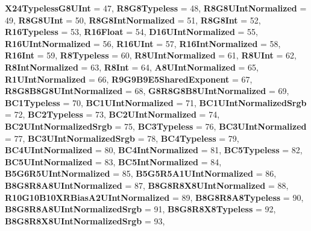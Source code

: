 \begin{DoxyCompactItemize}
{\bfseries X24\+Typeless\+G8\+U\+Int} = 47, 
\newline
{\bfseries R8\+G8\+Typeless} = 48, 
{\bfseries R8\+G8\+U\+Int\+Normalized} = 49, 
{\bfseries R8\+G8\+U\+Int} = 50, 
{\bfseries R8\+G8\+Int\+Normalized} = 51, 
\newline
{\bfseries R8\+G8\+Int} = 52, 
{\bfseries R16\+Typeless} = 53, 
{\bfseries R16\+Float} = 54, 
{\bfseries D16\+U\+Int\+Normalized} = 55, 
\newline
{\bfseries R16\+U\+Int\+Normalized} = 56, 
{\bfseries R16\+U\+Int} = 57, 
{\bfseries R16\+Int\+Normalized} = 58, 
{\bfseries R16\+Int} = 59, 
\newline
{\bfseries R8\+Typeless} = 60, 
{\bfseries R8\+U\+Int\+Normalized} = 61, 
{\bfseries R8\+U\+Int} = 62, 
{\bfseries R8\+Int\+Normalized} = 63, 
\newline
{\bfseries R8\+Int} = 64, 
{\bfseries A8\+U\+Int\+Normalized} = 65, 
{\bfseries R1\+U\+Int\+Normalized} = 66, 
{\bfseries R9\+G9\+B9\+E5\+Shared\+Exponent} = 67, 
\newline
{\bfseries R8\+G8\+B8\+G8\+U\+Int\+Normalized} = 68, 
{\bfseries G8\+R8\+G8\+B8\+U\+Int\+Normalized} = 69, 
{\bfseries B\+C1\+Typeless} = 70, 
{\bfseries B\+C1\+U\+Int\+Normalized} = 71, 
\newline
{\bfseries B\+C1\+U\+Int\+Normalized\+Srgb} = 72, 
{\bfseries B\+C2\+Typeless} = 73, 
{\bfseries B\+C2\+U\+Int\+Normalized} = 74, 
{\bfseries B\+C2\+U\+Int\+Normalized\+Srgb} = 75, 
\newline
{\bfseries B\+C3\+Typeless} = 76, 
{\bfseries B\+C3\+U\+Int\+Normalized} = 77, 
{\bfseries B\+C3\+U\+Int\+Normalized\+Srgb} = 78, 
{\bfseries B\+C4\+Typeless} = 79, 
\newline
{\bfseries B\+C4\+U\+Int\+Normalized} = 80, 
{\bfseries B\+C4\+Int\+Normalized} = 81, 
{\bfseries B\+C5\+Typeless} = 82, 
{\bfseries B\+C5\+U\+Int\+Normalized} = 83, 
\newline
{\bfseries B\+C5\+Int\+Normalized} = 84, 
{\bfseries B5\+G6\+R5\+U\+Int\+Normalized} = 85, 
{\bfseries B5\+G5\+R5\+A1\+U\+Int\+Normalized} = 86, 
{\bfseries B8\+G8\+R8\+A8\+U\+Int\+Normalized} = 87, 
\newline
{\bfseries B8\+G8\+R8\+X8\+U\+Int\+Normalized} = 88, 
{\bfseries R10\+G10\+B10\+X\+R\+Bias\+A2\+U\+Int\+Normalized} = 89, 
{\bfseries B8\+G8\+R8\+A8\+Typeless} = 90, 
{\bfseries B8\+G8\+R8\+A8\+U\+Int\+Normalized\+Srgb} = 91, 
\newline
{\bfseries B8\+G8\+R8\+X8\+Typeless} = 92, 
{\bfseries B8\+G8\+R8\+X8\+U\+Int\+Normalized\+Srgb} = 93, 

\end{DoxyCompactItemize}
